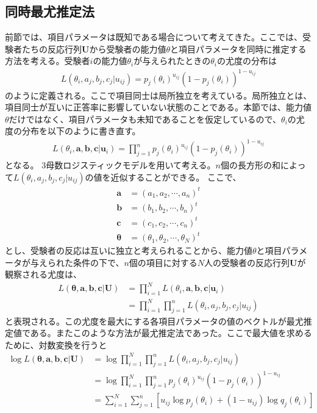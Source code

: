 \documentclass[12pt]{jarticle}
\numberwithin{equation}{subsection}
\begin{document}
\subsection{同時最尤推定法}
前節では、項目パラメータは既知である場合について考えてきた。ここでは、受験者たちの反応行列$\boldsymbol U$から受験者の能力値$\theta$と項目パラメータを同時に推定する方法を考える。受験者$i$の能力値$\theta_i$が与えられたときの$\theta_i$の尤度の分布は
\begin{align}
  \displaystyle
  L(\theta_i,a_j,b_j,c_j|u_{ij}) = p_j(\theta_i)^{u_{ij}} (1 - p_j(\theta_i))^{1 - u_{ij}}
\end{align}のように定義される。ここで項目同士は局所独立を考えている。局所独立とは、項目同士が互いに正答率に影響していない状態のことである。本節では、能力値$\theta$だけではなく、項目パラメータも未知であることを仮定しているので、$\theta_i$の尤度の分布を以下のように書き直す。
\begin{align}
  \displaystyle L(\theta_i,\boldsymbol{a},\boldsymbol{b},\boldsymbol{c}| \boldsymbol{u}_{i}) = \prod_{j = 1}^{n} p_j(\theta_i)^{u_{ij}}(1- p_j(\theta_i))^{1-u_{ij}}
\end{align}
となる。
$3$母数ロジスティックモデルを用いて考える。$n$個の長方形の和によって$L(\theta_i,a_j,b_j,c_j|u_{ij})$の値を近似することができる。
ここで、
\begin{align*}
  \displaystyle \boldsymbol{a}&=(a_1,a_2,\cdots,a_n)^{t} \\
  \boldsymbol{b}&= (b_1,b_2,\cdots,b_n)^{t} \\
  \boldsymbol{c}&= (c_1,c_2,\cdots,c_n)^{t} \\
  \boldsymbol{\theta}&= (\theta_1,\theta_2,\cdots,\theta_N)^{t}
\end{align*}
とし、受験者の反応は互いに独立と考えられることから、能力値$\theta$と項目パラメータが与えられた条件の下で、$n$個の項目に対する$N$人の受験者の反応行列$\boldsymbol{U}$が観察される尤度は、
\begin{align}
  \displaystyle L(\boldsymbol{\theta},\boldsymbol{a},\boldsymbol{b},\boldsymbol{c}| \boldsymbol{U})\nonumber &= \prod_{i = 1}^{N} L(\theta_i,\boldsymbol{a},\boldsymbol{b},\boldsymbol{c}|\boldsymbol{u}_i)\\ &= \prod_{i = 1}^{N}\prod_{j = 1}^{n} L(\theta_i,a_j,b_j,c_j|u_{ij})
\end{align}
と表現される。この尤度を最大にする各項目パラメータの値のベクトルが最尤推定値である。またこのような方法が最尤推定法であった。ここで最大値を求めるために、対数変換を行うと
\begin{align}
  \displaystyle \log L(\boldsymbol{\theta},\boldsymbol{a},\boldsymbol{b},\boldsymbol{c}|\boldsymbol{U})  &= \log \prod_{i = 1}^{N}\prod_{j = 1}^{n} L(\theta_i,a_j,b_j,c_j|u_{ij})\nonumber\\ &=  \log \prod_{i = 1}^{N}\prod_{j = 1}^{n}  p_j(\theta_i)^{u_{ij}}(1- p_j(\theta_i))^{1-u_{ij}} \nonumber \\ &=  \sum_{i = 1}^{N} \sum_{j = 1}^{n} [u_{ij} \log p_j(\theta_i) + (1 - u_{ij}) \log q_j(\theta_i)]
\end{align}
\end{document}
